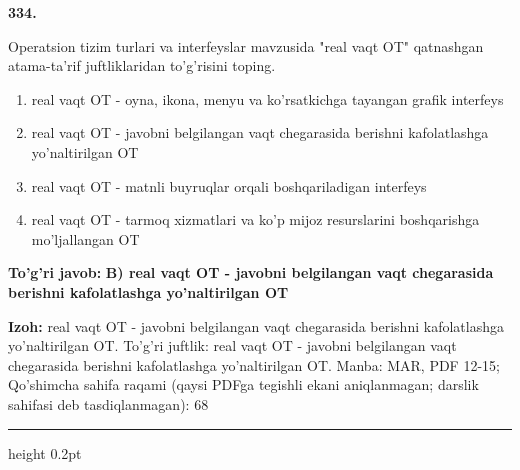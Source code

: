 \documentclass[10pt,a4paper]{article}
\begin{document}
{\bfseries\sffamily\color{ink} 334.}
\par
Operatsion tizim turlari va interfeyslar mavzusida "real vaqt OT" qatnashgan atama-ta'rif juftliklaridan to'g'risini toping.
\begin{enumerate}[label=\Alph*),leftmargin=9mm]
\item real vaqt OT - oyna, ikona, menyu va ko'rsatkichga tayangan grafik interfeys
\item real vaqt OT - javobni belgilangan vaqt chegarasida berishni kafolatlashga yo'naltirilgan OT
\item real vaqt OT - matnli buyruqlar orqali boshqariladigan interfeys
\item real vaqt OT - tarmoq xizmatlari va ko'p mijoz resurslarini boshqarishga mo'ljallangan OT
\end{enumerate}
\begin{tcolorbox}[enhanced,breakable,colback=teal!4,colframe=teal!60!black,boxrule=0.45pt,arc=1.2mm,left=2.7mm,right=2.7mm,top=1.8mm,bottom=1.8mm,before skip=2mm,after skip=2mm]
{\bfseries\sffamily\color{teal}To'g'ri javob:} \textbf{B) real vaqt OT - javobni belgilangan vaqt chegarasida berishni kafolatlashga yo'naltirilgan OT}
\par\smallskip
{\bfseries Izoh:} real vaqt OT - javobni belgilangan vaqt chegarasida berishni kafolatlashga yo'naltirilgan OT. To'g'ri juftlik: real vaqt OT - javobni belgilangan vaqt chegarasida berishni kafolatlashga yo'naltirilgan OT. Manba: MAR, PDF 12-15; Qo'shimcha sahifa raqami (qaysi PDFga tegishli ekani aniqlanmagan; darslik sahifasi deb tasdiqlanmagan): 68
\end{tcolorbox}
\vspace{2mm}\hrule height 0.2pt\vspace{3mm}
\end{document}
